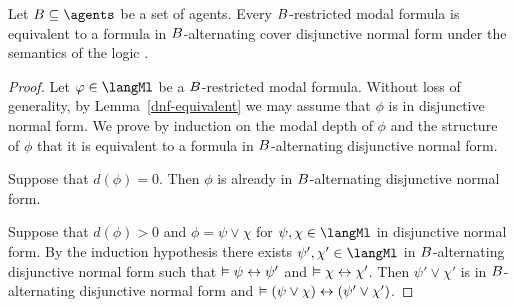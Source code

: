 \begin{lemma}
Let $\agentsB \subseteq \agents$ be a set of agents.
Every $B$-restricted modal formula is equivalent to a formula in $B$-alternating cover disjunctive normal form under the semantics of the logic \logicKD{}.
\end{lemma}

\begin{proof}
Let $\phi \in \langMl$ be a $B$-restricted modal formula.
Without loss of generality, by Lemma~\ref{dnf-equivalent} we may assume that $\phi$ is in disjunctive normal form.
We prove by induction on the modal depth of $\phi$ and the structure of $\phi$ that it is equivalent to a formula in $B$-alternating disjunctive normal form.

Suppose that $d(\phi) = 0$. 
Then $\phi$ is already in $B$-alternating disjunctive normal form.

Suppose that $d(\phi) > 0$ and $\phi = \psi \lor \chi$ for $\psi, \chi \in \langMl$ in disjunctive normal form.
By the induction hypothesis there exists $\psi', \chi' \in \langMl$ in $B$-alternating disjunctive normal form such that $\vDash \psi \leftrightarrow \psi'$ and $\vDash \chi \leftrightarrow \chi'$.
Then $\psi' \lor \chi'$ is in $B$-alternating disjunctive normal form and $\vDash (\psi \lor \chi) \leftrightarrow (\psi' \lor \chi')$.


\end{proof}
